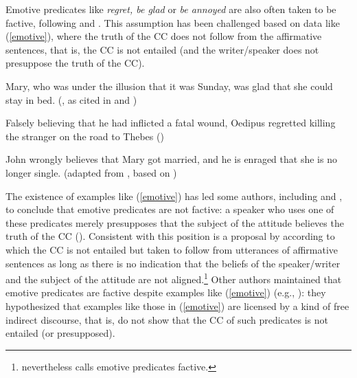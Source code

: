\documentclass[11pt,fleqn]{article}
\newcommand{\6}{\mbox{$[\hspace*{-.6mm}[$}}
\newcommand{\9}{\mbox{$]\hspace*{-.6mm}]$}}
\begin{document}




%

Emotive predicates like {\em regret, be glad} or {\em be annoyed} are also often taken to be factive, following \citealt{kiparsky-kiparsky70} and \citealt{karttunen71b}. This assumption has been challenged based on data like (\ref{emotive}), where the truth of the CC does not follow from the affirmative sentences, that is, the CC is not entailed (and the writer/speaker does not presuppose the truth of the CC).

\begin{exe}
\ex\label{emotive}
\begin{xlist}

\ex\label{heim2} Mary, who was under the illusion that it was Sunday, was glad that she could stay in bed. (\citealt{klein1975}, as cited in \citealt[122]{gazdar79a} and \citealt[fn37]{heim92}) 

\ex Falsely believing that he had inflicted a fatal wound, Oedipus regretted killing the stranger on the road to Thebes \hfill (\citealt{klein1975})

\ex John wrongly believes that Mary got married, and he is enraged that she is no longer single. \hspace*{.2cm} \hfill (adapted from \citealt{egre2008}, based on \citealt{schlenker03})

\end{xlist}
\end{exe}
The existence of examples like (\ref{emotive}) has led some authors, including \citet{klein1975,giannakidou1998,schlenker2003} and \citet{egre2008}, to conclude that emotive predicates are not factive: a speaker who uses one of these predicates merely presupposes that the subject of the attitude believes the truth of the CC (\citealt{heim92}). Consistent with this position is a proposal by \citet{karttunen2016} according to which the CC is not entailed but taken to follow from utterances of affirmative sentences as long as there is no indication that the beliefs of the speaker/writer and the subject of the attitude are not aligned.\footnote{\citet{karttunen2016} nevertheless calls emotive predicates factive.}  Other authors maintained that emotive predicates are factive despite examples like (\ref{emotive}) (e.g., \citealt{gazdar79a,abrusan2011,anand-hacquard2014}): they hypothesized that examples like those in (\ref{emotive}) are licensed by a kind of free indirect discourse, that is, do not show that the CC of such predicates is not entailed (or presupposed). 
\end{document}
